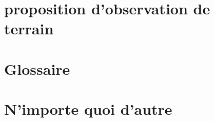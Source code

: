 \chapter{proposition d'observation de terrain}

\chapter{Glossaire}
\printglossaries
\chapter{N'importe quoi d'autre}